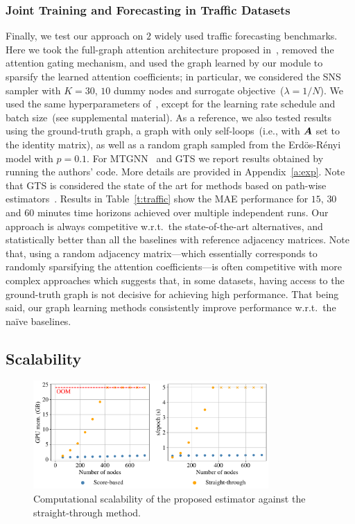 \subsubsection{Joint Training and Forecasting in Traffic Datasets} 

Finally, we test our approach on $2$ widely used traffic forecasting benchmarks. Here we took the full-graph attention architecture proposed in~\citep{satorras2022multivariate}, removed the attention gating mechanism, and used the graph learned by our module to sparsify the learned attention coefficients; in particular, we considered the SNS sampler with $K=30$, $10$ dummy nodes and surrogate objective~($\lambda=1/N$). We used the same hyperparameters of~\citep{satorras2022multivariate}, except for the learning rate schedule and batch size~(see supplemental material). As a reference, we also tested results using the ground-truth graph, a graph with only self-loops~(i.e., with ${\bm{A}}$ set to the identity matrix), as well as a random graph sampled from the Erd\"os-R\'enyi model with $p=0.1$. For MTGNN~\citep{wu2020connecting} and GTS we report results obtained by running the authors' code. More details are provided in Appendix~\ref{a:exp}. Note that GTS is considered the state of the art for methods based on path-wise estimators~\citep{zugner2021study}. Results in Table~\ref{t:traffic} show the MAE performance for $15$, $30$ and $60$ minutes time horizons achieved over multiple independent runs. 
Our approach is always competitive w.r.t.\ the state-of-the-art alternatives, and statistically better than all the baselines with reference adjacency matrices. Note that, using a random adjacency matrix---which essentially corresponds to randomly sparsifying the attention coefficients---is often competitive with more complex approaches which suggests that, in some datasets, having access to the ground-truth graph is not decisive for achieving high performance. That being said, our graph learning methods consistently improve performance w.r.t.\ the na\"ive baselines.



\subsection{Scalability}\label{sec:scalability}

\begin{figure}
    \centering
    \includegraphics[width=0.8\textwidth]{imgs/profiling.pdf}
    \caption{Computational scalability of the proposed estimator against the straight-through method.}
    \label{fig:scalability}
\end{figure}

